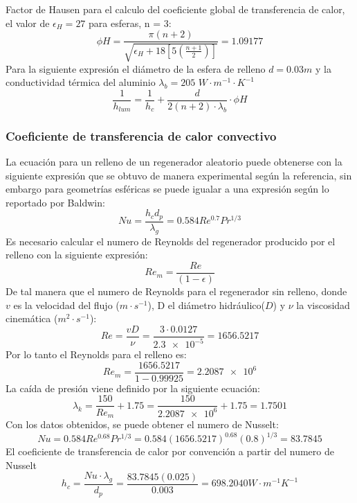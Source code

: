 \documentclass[12pt,letterpaper,final]{article}%
\begin{document}
Factor de Hausen para el calculo del coeficiente global de transferencia de calor, el valor de $\epsilon_H =27$ para esferas, n = 3:
\begin{equation*}
	\phi H = \frac{\pi (n+2)}{\sqrt{\epsilon_H + 18[5(\frac{n+1}{2})] }} = 1.09177
\end{equation*}
Para la siguiente expresión el diámetro de la esfera de relleno $d=0.03 m$ y la conductividad térmica del aluminio $\lambda_b =205$ $W \cdot m^{-1} \cdot K^{-1}$
\begin{equation*}
	\frac{1}{h_{lum}} = \frac{1}{h_c} + \frac{d}{2(n+2)\cdot \lambda_b} \cdot \phi H
\end{equation*}
\subsubsection{Coeficiente de transferencia de calor convectivo}
La ecuación para un relleno de un regenerador aleatorio puede obtenerse con la siguiente expresión que se obtuvo de manera experimental según la referencia\cite{AMELIO2007}, sin embargo para geometrías esféricas se puede igualar a una expresión según lo reportado por Baldwin\cite{Baldwin1966HeatTI}:
\begin{equation*}
	Nu = \frac{h_c d_p}{\lambda_g} = 0.584Re^{0.7}Pr^{1/3} 
\end{equation*}
Es necesario calcular el numero de Reynolds del regenerador producido por el relleno con la siguiente expresión:
\begin{equation*}
	Re_m = \frac{Re}{(1-\epsilon)}
\end{equation*}
De tal manera que el numero de Reynolds para el regenerador sin relleno, donde $v$ es la velocidad del flujo ($m \cdot s^{-1}$), D el diámetro hidráulico($D$) y $\nu$ la viscosidad cinemática ($m^2 \cdot s^{-1}$)\cite{Ergun1952FluidFT}:
\begin{equation*}
	Re = \frac{vD}{\nu} = \frac{3 \cdot \num{0.0127} }{\num{2.3e-5}} = 1656.5217
\end{equation*}
Por lo tanto el Reynolds para el relleno es:
\begin{equation*}
	Re_m = \frac{1656.5217}{1-0.99925} = \num{2.2087e6}
\end{equation*}
La caída de presión viene definido por la siguiente ecuación:
\begin{equation*}
	\lambda_k = \frac{150}{Re_m} +1.75 = \frac{150}{\num{2.2087e6}} + 1.75 = 1.7501
\end{equation*}
Con los datos obtenidos, se puede obtener el numero de Nusselt:
\begin{equation*}
	Nu = 0.584Re^{0.68}Pr^{1/3} = 0.584(1656.5217)^{0.68}(0.8)^{1/3} = 83.7845
\end{equation*}
El coeficiente de transferencia de calor por convención a partir del numero de Nusselt
\begin{equation*}
	h_c = \frac{Nu \cdot \lambda_g}{d_p} = \frac{83.7845 (0.025)}{0.003} = 698.2040 W\cdot m^{-1} K^{-1}
\end{equation*}
\end{document}
